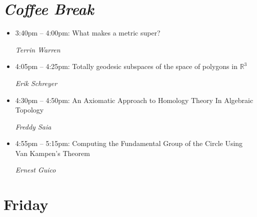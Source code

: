 \documentclass[oneside]{amsart}
\begin{document}
\section*{\textit{Coffee Break}}
\vspace{0.5em}
\begin{itemize}
\setlength\itemsep{1em}

\item 3:40pm -- 4:00pm: What makes a metric super?  \\ \vspace{-1.5em} \begin{flushright}\textit{ Terrin Warren }\end{flushright}
\item 4:05pm -- 4:25pm: Totally geodesic subspaces of the space of polygons in \(\mathbb{R}^3\) \\ \vspace{-1.5em} \begin{flushright}\textit{ Erik Schreyer }\end{flushright}
\item 4:30pm -- 4:50pm: An Axiomatic Approach to Homology Theory In Algebraic Topology \\ \vspace{-1.5em} \begin{flushright}\textit{ Freddy Saia }\end{flushright}
\item 4:55pm -- 5:15pm: Computing the Fundamental Group of the Circle Using Van Kampen's Theorem \\ \vspace{-1.5em} \begin{flushright}\textit{ Ernest Guico }\end{flushright}

\end{itemize}

\newpage
\section*{\textbf{Friday}}
\end{document}

